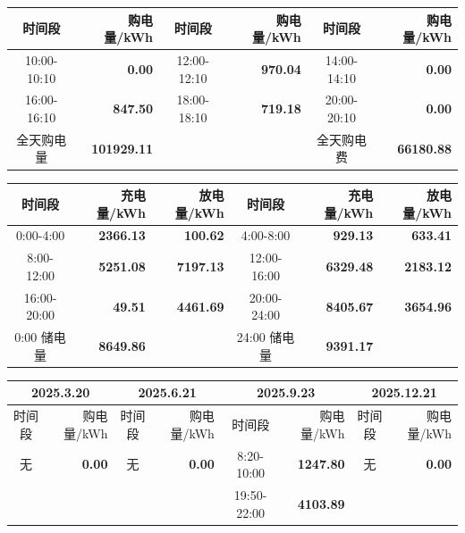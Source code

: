 {\begin{center}
\vspace{0.15\baselineskip}
\begin{tabular}{|c|r|c|r|c|r|}
\hline
时间段 & 购电量/kWh & 时间段 & 购电量/kWh & 时间段 & 购电量/kWh \\
\hline
10:00-10:10 & \textbf{0.00} & 12:00-12:10 & \textbf{970.04} & 14:00-14:10 & \textbf{0.00} \\
\hline
16:00-16:10 & \textbf{847.50} & 18:00-18:10 & \textbf{719.18} & 20:00-20:10 & \textbf{0.00} \\
\hline
全天购电量 & \textbf{101929.11} & & & 全天购电费 & \textbf{66180.88} \\
\hline
\end{tabular}
\par{}

\vspace{0.15\baselineskip}
\begin{tabular}{|c|r|r|c|r|r|}
\hline
时间段 & 充电量/kWh & 放电量/kWh & 时间段 & 充电量/kWh & 放电量/kWh \\
\hline
0:00-4:00 & \textbf{2366.13} & \textbf{100.62} & 4:00-8:00 & \textbf{929.13} & \textbf{633.41} \\
\hline
8:00-12:00 & \textbf{5251.08} & \textbf{7197.13} & 12:00-16:00 & \textbf{6329.48} & \textbf{2183.12} \\
\hline
16:00-20:00 & \textbf{49.51} & \textbf{4461.69} & 20:00-24:00 & \textbf{8405.67} & \textbf{3654.96} \\
\hline
0:00 储电量 & \textbf{8649.86} & & 24:00 储电量 & \textbf{9391.17} & \\
\hline
\end{tabular}
\par{}

\vspace{0.15\baselineskip}
\begin{tabular}{|c|r|c|r|c|r|c|r|}
\hline
\multicolumn{2}{c|}{2025.3.20} & \multicolumn{2}{c|}{2025.6.21} & \multicolumn{2}{c|}{2025.9.23} & \multicolumn{2}{c|}{2025.12.21} \\
\hline
时间段 & 购电量/kWh & 时间段 & 购电量/kWh & 时间段 & 购电量/kWh & 时间段 & 购电量/kWh \\
\hline
无 & \textbf{0.00} & 无 & \textbf{0.00} & 8:20-10:00 & \textbf{1247.80} & 无 & \textbf{0.00} \\
\hline
 &  &  &  & 19:50-22:00 & \textbf{4103.89} &  &  \\
\hline
\end{tabular}
\par{}

\end{center}
}
